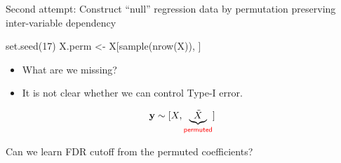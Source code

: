 \documentclass[
  ignorenonframetext,
  aspectratio=169]{beamer}
\newenvironment{Shaded}{\begin{snugshade}}{\end{snugshade}}
\newcommand{\DecValTok}[1]{\textcolor[rgb]{0.00,0.00,0.81}{#1}}
\newcommand{\FunctionTok}[1]{\textcolor[rgb]{0.00,0.00,0.00}{#1}}
\newcommand{\NormalTok}[1]{#1}
\newcommand{\OtherTok}[1]{\textcolor[rgb]{0.56,0.35,0.01}{#1}}
\begin{document}
\begin{frame}[fragile]{Second attempt: Construct ``null'' regression
data by permutation preserving inter-variable dependency}
\protect\hypertarget{second-attempt-construct-null-regression-data-by-permutation-preserving-inter-variable-dependency}{}
\large

\begin{Shaded}
\begin{Highlighting}[]
\FunctionTok{set.seed}\NormalTok{(}\DecValTok{17}\NormalTok{)}
\NormalTok{X.perm }\OtherTok{\textless{}{-}}\NormalTok{ X[}\FunctionTok{sample}\NormalTok{(}\FunctionTok{nrow}\NormalTok{(X)), ]}
\end{Highlighting}
\end{Shaded}

\normalsize

\scriptsize

\normalsize

\Large

\begin{itemize}
\item
  What are we missing?
\item
  It is not clear whether we can control Type-I error.
\end{itemize}

\[\mathbf{y} \sim [X, \underbrace{\tilde{X}}_{\textsf{\color{red} permuted}}]\]
\end{frame}

\begin{frame}{Can we learn FDR cutoff from the permuted coefficients?}
\protect\hypertarget{can-we-learn-fdr-cutoff-from-the-permuted-coefficients-1}{}
\scriptsize

\normalsize

\scriptsize


\normalsize

\scriptsize


\normalsize
\end{frame}
\end{document}
